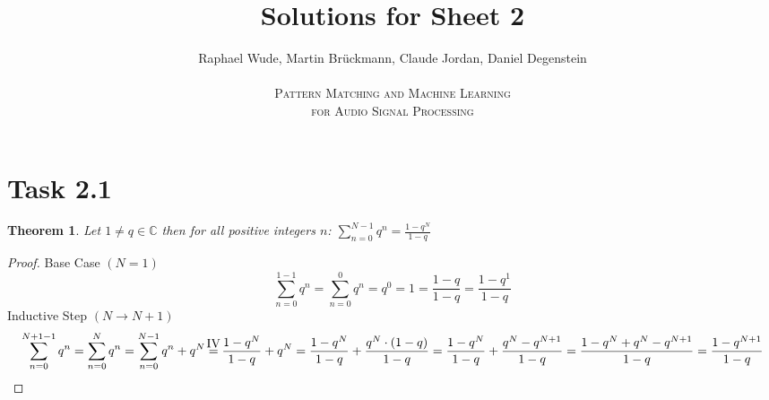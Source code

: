 \documentclass[12pt]{article}
\newcommand{\C}{\mathbb{C}}
\newtheorem{thm}{Theorem}
\newcommand\myeq{\stackrel{\mathclap{\normalfont\mbox{IV}}}{=}}
\begin{document}
\title{Solutions for Sheet 2}
\author{Raphael Wude, Martin Brückmann, Claude Jordan, Daniel Degenstein\\ \\
\textsc{Pattern Matching and Machine Learning} \\
\textsc{for Audio Signal Processing}}
\maketitle

\section*{Task 2.1}
\begin{thm} Let $1 \neq q \in \C$ then for all positive integers $n$: $\sum^{N-1}_{n=0}q^n = \frac{1-q^N}{1-q}$\end{thm}
\begin{proof}
Base Case $\left(N=1\right)$
$$\sum^{1-1}_{n=0}q^n = \sum^{0}_{n=0}q^n = q^0 = 1 = \frac{1-q}{1-q} = \frac{1-q^1}{1-q}$$
Inductive Step $\left(N \longrightarrow N+1\right)$
$$\sum^{N+1-1}_{n=0}q^n = \sum^{N}_{n=0}q^n = \sum^{N-1}_{n=0}q^n + q^N \myeq \frac{1-q^N}{1-q} + q^N = \frac{1-q^N}{1-q} + \frac{q^N\cdot (1-q)}{1-q} = \frac{1-q^N}{1-q} + \frac{q^N-q^{N+1}}{1-q} = \frac{1-q^N+q^N-q^{N+1}}{1-q} = \frac{1-q^{N+1}}{1-q}$$
\end{proof}

 
\end{document}
